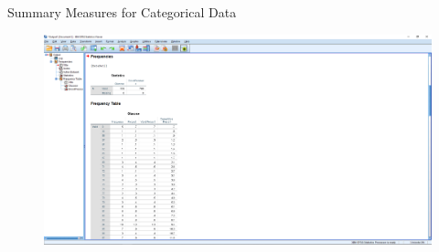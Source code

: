 \begin{frame}[t]{Summary Measures for Categorical Data}
	\begin{figure}
		\centering
		\includegraphics[width=12cm]{img/freq_table1_3}
	\end{figure}
\end{frame}


